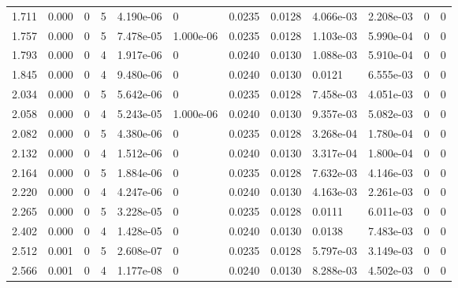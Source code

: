 \documentclass[preview]{standalone}
\begin{document}
{{\begin{tabular}{L{1.2cm}C{1.2cm} C{0.3cm}C{0.5cm} C{1.4cm}C{1.4cm} C{1.4cm}C{1.4cm} C{1.6cm}C{1.6cm} C{1.6cm}C{1.6cm}}
  1.711  &  0.000  & 0     &  5 &  4.190e-06  & 0  &  0.0235&   0.0128& 4.066e-03 & 2.208e-03   &  0 & 0  \\ 
  1.757  &  0.000  & 0     &  5 &  7.478e-05  & 1.000e-06  &  0.0235&   0.0128& 1.103e-03 & 5.990e-04   &  0 & 0  \\ 
  1.793  &  0.000  & 0     &  4 &  1.917e-06  & 0  &  0.0240&   0.0130& 1.088e-03 & 5.910e-04   &  0 & 0  \\ 
  1.845  &  0.000  & 0     &  4 &  9.480e-06  & 0  &  0.0240&   0.0130& 0.0121 & 6.555e-03   &  0 & 0  \\ 
  2.034  &  0.000  & 0     &  5 &  5.642e-06  & 0  &  0.0235&   0.0128& 7.458e-03 & 4.051e-03   &  0 & 0  \\ 
  2.058  &  0.000  & 0     &  4 &  5.243e-05  & 1.000e-06  &  0.0240&   0.0130& 9.357e-03 & 5.082e-03   &  0 & 0  \\ 
  2.082  &  0.000  & 0     &  5 &  4.380e-06  & 0  &  0.0235&   0.0128& 3.268e-04 & 1.780e-04   &  0 & 0  \\ 
  2.132  &  0.000  & 0     &  4 &  1.512e-06  & 0  &  0.0240&   0.0130& 3.317e-04 & 1.800e-04   &  0 & 0  \\ 
  2.164  &  0.000  & 0     &  5 &  1.884e-06  & 0  &  0.0235&   0.0128& 7.632e-03 & 4.146e-03   &  0 & 0  \\ 
  2.220  &  0.000  & 0     &  4 &  4.247e-06  & 0  &  0.0240&   0.0130& 4.163e-03 & 2.261e-03   &  0 & 0  \\ 
  2.265  &  0.000  & 0     &  5 &  3.228e-05  & 0  &  0.0235&   0.0128& 0.0111 & 6.011e-03   &  0 & 0  \\ 
  2.402  &  0.000  & 0     &  4 &  1.428e-05  & 0  &  0.0240&   0.0130& 0.0138 & 7.483e-03   &  0 & 0  \\ 
  2.512  &  0.001  & 0     &  5 &  2.608e-07  & 0  &  0.0235&   0.0128& 5.797e-03 & 3.149e-03   &  0 & 0  \\ 
  2.566  &  0.001  & 0     &  4 &  1.177e-08  & 0  &  0.0240&   0.0130& 8.288e-03 & 4.502e-03   &  0 & 0  \\ 
\hline 
\end{tabular} 

}}
\end{document}
